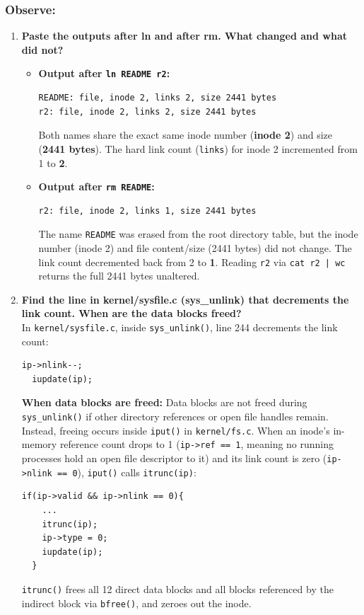 \documentclass{labreport}
\begin{document}
\subsubsection*{Observe:}
\begin{enumerate}[leftmargin=*]
    \item \textbf{Paste the outputs after ln and after rm. What changed and what did not?}
    \begin{itemize}[noitemsep, topsep=2pt]
        \item \textbf{Output after \texttt{ln README r2}:}
\begin{lstlisting}[style=bash]
README: file, inode 2, links 2, size 2441 bytes
r2: file, inode 2, links 2, size 2441 bytes
\end{lstlisting}
        Both names share the exact same inode number (\textbf{inode 2}) and size (\textbf{2441 bytes}). The hard link count (\texttt{links}) for inode 2 incremented from 1 to \textbf{2}.
        \item \textbf{Output after \texttt{rm README}:}
\begin{lstlisting}[style=bash]
r2: file, inode 2, links 1, size 2441 bytes
\end{lstlisting}
        The name \texttt{README} was erased from the root directory table, but the inode number (inode 2) and file content/size (2441 bytes) did not change. The link count decremented back from 2 to \textbf{1}. Reading \texttt{r2} via \texttt{cat r2 | wc} returns the full 2441 bytes unaltered.
    \end{itemize}

    \item \textbf{Find the line in kernel/sysfile.c (sys\_unlink) that decrements the link count. When are the data blocks freed?}\\[0.2em]
    In \texttt{kernel/sysfile.c}, inside \texttt{sys\_unlink()}, line 244 decrements the link count:
\begin{lstlisting}[style=c]
  ip->nlink--;
  iupdate(ip);
\end{lstlisting}
    \textbf{When data blocks are freed:} Data blocks are not freed during \texttt{sys\_unlink()} if other directory references or open file handles remain. Instead, freeing occurs inside \texttt{iput()} in \texttt{kernel/fs.c}. When an inode's in-memory reference count drops to 1 (\texttt{ip->ref == 1}, meaning no running processes hold an open file descriptor to it) and its link count is zero (\texttt{ip->nlink == 0}), \texttt{iput()} calls \texttt{itrunc(ip)}:
\begin{lstlisting}[style=c]
  if(ip->valid && ip->nlink == 0){
    ...
    itrunc(ip);
    ip->type = 0;
    iupdate(ip);
  }
\end{lstlisting}
    \texttt{itrunc()} frees all 12 direct data blocks and all blocks referenced by the indirect block via \texttt{bfree()}, and zeroes out the inode.


\end{enumerate}
\end{document}
